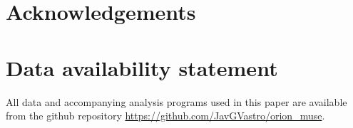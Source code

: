 \documentclass[fleqn,usenatbib, useAMS, a4paper]{mnras}
\begin{document}
\section*{Acknowledgements}

\section*{Data availability statement}
\label{sec:data-avail-stat}
All data and accompanying analysis programs used in this paper are available
from the github repository \url{https://github.com/JavGVastro/orion_muse}.






%
\bsp	%
\label{lastpage}
\end{document}
